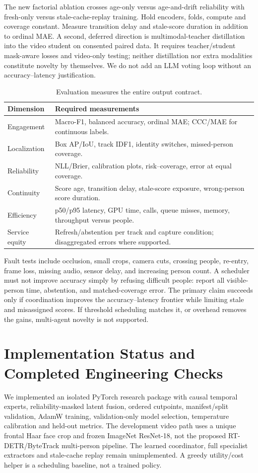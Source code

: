 \documentclass[a4paper,conference]{IEEEtran}
\begin{document}
The new factorial ablation crosses age-only versus age-and-drift reliability with fresh-only versus stale-cache-replay training. Hold encoders, folds, compute and coverage constant. Measure transition delay and stale-score duration in addition to ordinal MAE. A second, deferred direction is multimodal-teacher distillation into the video student on consented paired data. It requires teacher/student mask-aware losses and video-only testing; neither distillation nor extra modalities constitute novelty by themselves. We do not add an LLM voting loop without an accuracy--latency justification.

\begin{table}[t]
\caption{Evaluation measures the entire output contract.}\centering\footnotesize
\begin{tabular}{p{}p{}}
\toprule
Dimension & Required measurements\\
\midrule
Engagement & Macro-F1, balanced accuracy, ordinal MAE; CCC/MAE for continuous labels.\\
Localization & Box AP/IoU, track IDF1, identity switches, missed-person coverage.\\
Reliability & NLL/Brier, calibration plots, risk--coverage, error at equal coverage.\\
Continuity & Score age, transition delay, stale-score exposure, wrong-person score duration.\\
Efficiency & p50/p95 latency, GPU time, calls, queue misses, memory, throughput versus people.\\
Service equity & Refresh/abstention per track and capture condition; disaggregated errors where supported.\\
\bottomrule
\end{tabular}
\end{table}

Fault tests include occlusion, small crops, camera cuts, crossing people, re-entry, frame loss, missing audio, sensor delay, and increasing person count. A scheduler must not improve accuracy simply by refusing difficult people: report all visible-person time, abstention, and matched-coverage error. The primary claim succeeds only if coordination improves the accuracy--latency frontier while limiting stale and misassigned scores. If threshold scheduling matches it, or overhead removes the gains, multi-agent novelty is not supported.

\section{Implementation Status and Completed Engineering Checks}
We implemented an isolated PyTorch research package with causal temporal experts, reliability-masked latent fusion, ordered cutpoints, manifest/split validation, AdamW training, validation-only model selection, temperature calibration and held-out metrics. The development video path uses a unique frontal Haar face crop and frozen ImageNet ResNet-18, not the proposed RT-DETR/ByteTrack multi-person pipeline. The learned coordinator, full specialist extractors and stale-cache replay remain unimplemented. A greedy utility/cost helper is a scheduling baseline, not a trained policy.
\end{document}

